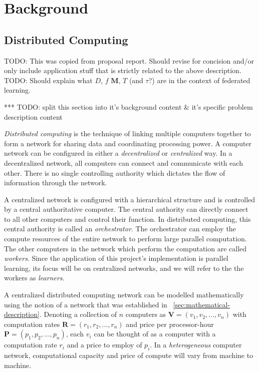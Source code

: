 \documentclass[../mthe-493-final-project.tex]{subfiles}
\begin{document}
    \chapter{Background}
    \label{ch:background}

    \section{Distributed Computing}
    \label{sec:distributed-computing}

    TODO: This was copied from proposal report. Should revise for concision and/or only include application stuff that is strictly related to the above description.
    TODO: Should explain what $D$, $f$ $\mathbf{M}$, $T$ (and $\tau$?) are in the context of federated learning.
    
    ***
    TODO: split this section into it's background content \& it's specific problem description content

    \textit{Distributed computing} is the technique of linking multiple computers together to form a network for sharing data and coordinating processing power. A computer network can be configured in either a \textit{decentralized} or \textit{centralized} way. In a decentralized network, all computers can connect and communicate with each other. There is no single controlling authority which dictates the flow of information through the network.

    A centralized network is configured with a hierarchical structure and is controlled by a central authoritative computer. The central authority can directly connect to all other computers and control their function. In distributed computing, this central authority is called an \textit{orchestrator}. The orchestrator can employ the compute resources of the entire network to perform large parallel computation. The other computers in the network which perform the computation are called \textit{workers}. Since the application of this project's implementation is parallel learning, its focus will be on centralized networks, and we will refer to the the workers as \textit{learners}.

    A centralized distributed computing network can be modelled mathematically using the notion of a network that was established in ~\autoref{sec:mathematical-description}. Denoting a collection of $n$ computers as $\mathbf{V} = (v_1, v_2, ..., v_n)$ with computation rates $\mathbf{R} = (r_1, r_2, ..., r_n)$ and price per processor-hour $\mathbf{P} = (p_1, p_2, ..., p_n)$, each $v_i$ can be thought of as a computer with a computation rate $r_i$ and a price to employ of $p_i$. In a \textit{heterogeneous} computer network, computational capacity and price of compute will vary from machine to machine.
\end{document}

